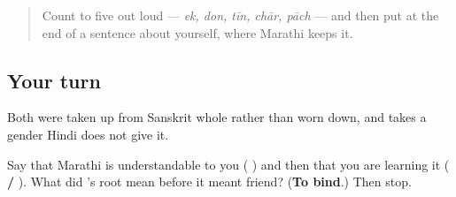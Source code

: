 \label{lesson:MR-R25-recognition-words}



\begin{quote}
Count to five out loud — \emph{ek, don, tīn, chār, pāch} — and then put \textbf{} at the end of a sentence about yourself, where Marathi keeps it.
\end{quote}

\subsection*{Your turn}
Both were taken up from Sanskrit whole rather than worn down, and \textbf{} takes a gender Hindi does not give it.

\begin{tcolorbox}[breakable,colback=teal!4,colframe=teal!35!black,title={Before you move on}]
Say that Marathi is understandable to you (\textbf{  }) and then that you are learning it (\textbf{   / }). What did \textbf{}'s root mean before it meant friend? (\textbf{To bind}.) Then stop.
\end{tcolorbox}
